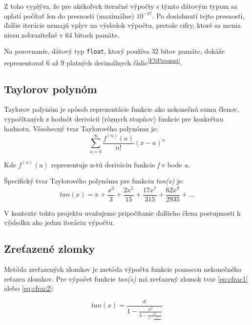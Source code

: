 \documentclass[12pt,a4paper,titlepage,final]{article}
\begin{document}
Z toho vyplýva, že pre akékoľvek iteračné výpočty s týmto dátovým typom sa oplatí počítať len do presnosti (maximálne) \textit{$10^{-17}$}. Po dosiahnutí tejto presnosti, ďalšie iterácie nemajú vplyv na výsledok výpočtu, pretože cifry, ktoré sa menia niesu zobraziteľné v 64 bitoch pamäte.

Na porovnanie, dátový typ \texttt{float}, ktorý používa 32 bitov pamäte, dokáže reprezentovať 6 až 9 platných decimálnych číslic\textsuperscript{\ref{FNPresnost}}.

\subsection{Taylorov polynóm}

Taylorov polynóm je spôsob reprezentácie funkcie ako nekonečnú sumu členov, vypočítaných z hodnôt derivácií (rôznych stupňov) funkcie pre konkrétnu hodnotu.
Všeobecný tvar Taylorového polynómu je:
\begin{equation}\label{eq:taylor1} 
\sum\limits_{n=0}^\infty \frac{f^{(n)}(a)}{n!}(x-a)^n
\end{equation}

Kde $f^{(n)}(a)$ reprezentuje n-tú deriváciu funkcie \textit{f} v bode \textit{a}.

Špecifický tvar Taylorového polynómu pre funkciu \textit{tan(x)} je:
\begin{equation}\label{eq:taylor2} 
tan(x) = x + \frac{x^3}{3} + \frac{2x^5}{15} + \frac{17x^7}{315} + \frac{62x^9}{2935} +...
\end{equation}

V kontexte tohto projektu uvažujeme pripočítanie ďalšieho člena postupnosti k výsledku ako jednu iteráciu výpočtu.

\subsection{Zreťazené zlomky}

Metóda zreťazených zlomkov je metóda výpočtu funkcie pomocou nekonečného reťazca zlomkov. Pre výpočet funkcie \textit{tan(x)} má zreťazený zlomok tvar \ref{eq:cfrac1} alebo \ref{eq:cfrac2}:

\begin{equation}\label{eq:cfrac1} 
tan(x) = \frac{x}{1 - \frac{x^2}{3 - \frac{x^2}{5 - \frac{x^2}{7 -...}}}}
\end{equation}
\end{document}
